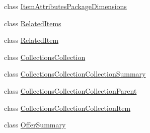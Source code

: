 \begin{DoxyCompactItemize}
class \hyperlink{class_price___comparison_1_1amazon_1_1ecs_1_1_item_attributes_package_dimensions}{Item\-Attributes\-Package\-Dimensions}
\begin{DoxyCompactList}\small\item\em \end{DoxyCompactList}\item 
class \hyperlink{class_price___comparison_1_1amazon_1_1ecs_1_1_related_items}{Related\-Items}
\begin{DoxyCompactList}\small\item\em \end{DoxyCompactList}\item 
class \hyperlink{class_price___comparison_1_1amazon_1_1ecs_1_1_related_item}{Related\-Item}
\begin{DoxyCompactList}\small\item\em \end{DoxyCompactList}\item 
class \hyperlink{class_price___comparison_1_1amazon_1_1ecs_1_1_collections_collection}{Collections\-Collection}
\begin{DoxyCompactList}\small\item\em \end{DoxyCompactList}\item 
class \hyperlink{class_price___comparison_1_1amazon_1_1ecs_1_1_collections_collection_collection_summary}{Collections\-Collection\-Collection\-Summary}
\begin{DoxyCompactList}\small\item\em \end{DoxyCompactList}\item 
class \hyperlink{class_price___comparison_1_1amazon_1_1ecs_1_1_collections_collection_collection_parent}{Collections\-Collection\-Collection\-Parent}
\begin{DoxyCompactList}\small\item\em \end{DoxyCompactList}\item 
class \hyperlink{class_price___comparison_1_1amazon_1_1ecs_1_1_collections_collection_collection_item}{Collections\-Collection\-Collection\-Item}
\begin{DoxyCompactList}\small\item\em \end{DoxyCompactList}\item 
class \hyperlink{class_price___comparison_1_1amazon_1_1ecs_1_1_offer_summary}{Offer\-Summary}
\begin{DoxyCompactList}\small\item\em \end{DoxyCompactList}\item 

\end{DoxyCompactItemize}
